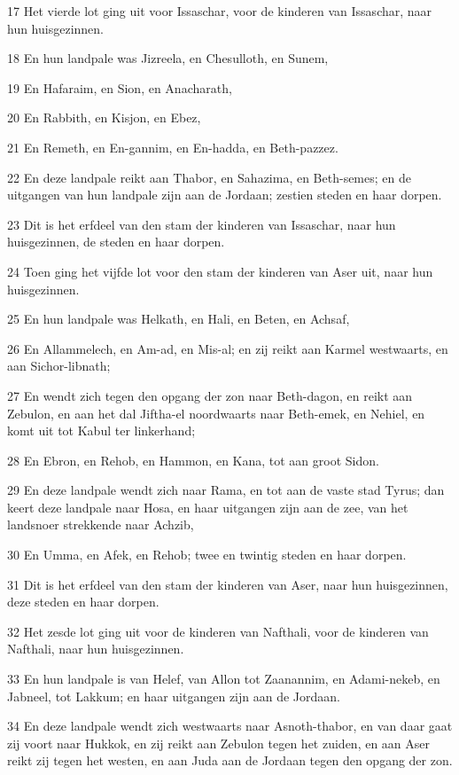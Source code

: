 \par 17 Het vierde lot ging uit voor Issaschar, voor de kinderen van Issaschar, naar hun huisgezinnen.
\par 18 En hun landpale was Jizreela, en Chesulloth, en Sunem,
\par 19 En Hafaraim, en Sion, en Anacharath,
\par 20 En Rabbith, en Kisjon, en Ebez,
\par 21 En Remeth, en En-gannim, en En-hadda, en Beth-pazzez.
\par 22 En deze landpale reikt aan Thabor, en Sahazima, en Beth-semes; en de uitgangen van hun landpale zijn aan de Jordaan; zestien steden en haar dorpen.
\par 23 Dit is het erfdeel van den stam der kinderen van Issaschar, naar hun huisgezinnen, de steden en haar dorpen.
\par 24 Toen ging het vijfde lot voor den stam der kinderen van Aser uit, naar hun huisgezinnen.
\par 25 En hun landpale was Helkath, en Hali, en Beten, en Achsaf,
\par 26 En Allammelech, en Am-ad, en Mis-al; en zij reikt aan Karmel westwaarts, en aan Sichor-libnath;
\par 27 En wendt zich tegen den opgang der zon naar Beth-dagon, en reikt aan Zebulon, en aan het dal Jiftha-el noordwaarts naar Beth-emek, en Nehiel, en komt uit tot Kabul ter linkerhand;
\par 28 En Ebron, en Rehob, en Hammon, en Kana, tot aan groot Sidon.
\par 29 En deze landpale wendt zich naar Rama, en tot aan de vaste stad Tyrus; dan keert deze landpale naar Hosa, en haar uitgangen zijn aan de zee, van het landsnoer strekkende naar Achzib,
\par 30 En Umma, en Afek, en Rehob; twee en twintig steden en haar dorpen.
\par 31 Dit is het erfdeel van den stam der kinderen van Aser, naar hun huisgezinnen, deze steden en haar dorpen.
\par 32 Het zesde lot ging uit voor de kinderen van Nafthali, voor de kinderen van Nafthali, naar hun huisgezinnen.
\par 33 En hun landpale is van Helef, van Allon tot Zaanannim, en Adami-nekeb, en Jabneel, tot Lakkum; en haar uitgangen zijn aan de Jordaan.
\par 34 En deze landpale wendt zich westwaarts naar Asnoth-thabor, en van daar gaat zij voort naar Hukkok, en zij reikt aan Zebulon tegen het zuiden, en aan Aser reikt zij tegen het westen, en aan Juda aan de Jordaan tegen den opgang der zon.
